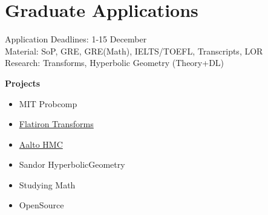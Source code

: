 \section{Graduate Applications}

\noindent Application Deadlines: 1-15 December\\
\noindent Material: SoP, GRE, GRE(Math), IELTS/TOEFL, Transcripts, LOR\\
\noindent Research: Transforms, Hyperbolic Geometry (Theory+DL)

\noindent \textbf{\Huge Projects}\\[0.3cm]

\begin{itemize}
    \item MIT Probcomp
    \item \hyperref[sec:transforms]{Flatiron Transforms}
    \item \hyperref[sec:aalto-hmc]{Aalto HMC}
    \item Sandor HyperbolicGeometry
    \item Studying Math
    \item OpenSource
\end{itemize}